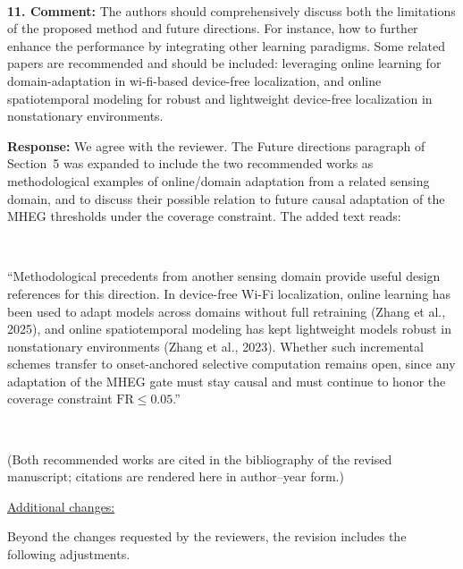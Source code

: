 \documentclass[1p,12pt,authoryear]{elsarticle}
\begin{document}
~

\noindent \textbf{11. Comment:} The authors should comprehensively discuss both the limitations of the proposed method and future directions. For instance, how to further enhance the performance by integrating other learning paradigms. Some related papers are recommended and should be included: leveraging online learning for domain-adaptation in wi-fi-based device-free localization, and online spatiotemporal modeling for robust and lightweight device-free localization in nonstationary environments.

\vspace{2mm}
\noindent \textbf{Response:} We agree with the reviewer. The Future directions paragraph of Section~5 was expanded to include the two recommended works as methodological examples of online/domain adaptation from a related sensing domain, and to discuss their possible relation to future causal adaptation of the MHEG thresholds under the coverage constraint. The added text reads:

~

``Methodological precedents from another sensing domain provide useful design references for this direction. In device-free Wi-Fi localization, online learning has been used to adapt models across domains without full retraining (Zhang et al., 2025), and online spatiotemporal modeling has kept lightweight models robust in nonstationary environments (Zhang et al., 2023). Whether such incremental schemes transfer to onset-anchored selective computation remains open, since any adaptation of the MHEG gate must stay causal and must continue to honor the coverage constraint $\mathrm{FR}\le0.05$.''

~

\noindent (Both recommended works are cited in the bibliography of the revised manuscript; citations are rendered here in author--year form.)

\newpage


\begin{large}
\noindent \underline{Additional changes:}
\end{large}

\vspace{10pt}

\noindent Beyond the changes requested by the reviewers, the revision includes the following adjustments.
\end{document}
